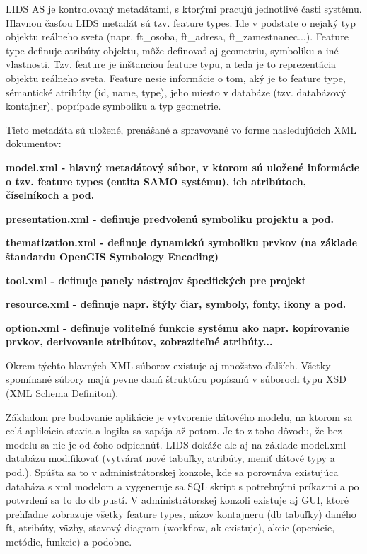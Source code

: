 LIDS AS je kontrolovaný metadátami, s ktorými pracujú jednotlivé časti systému. Hlavnou časťou LIDS metadát sú tzv. feature types. Ide v podstate o nejaký typ objektu reálneho sveta (napr. ft\_osoba, ft\_adresa, ft\_zamestnanec...). Feature type definuje atribúty objektu, môže definovať aj geometriu, symboliku a iné vlastnosti. Tzv. feature je inštanciou feature typu, a teda je to reprezentácia objektu reálneho sveta. Feature nesie informácie o tom, aký je to feature type, sémantické atribúty (id, name, type), jeho miesto v databáze (tzv. databázový kontajner), poprípade symboliku a typ geometrie.

Tieto metadáta sú uložené, prenášané a spravované vo forme nasledujúcich XML dokumentov:

\startitemize
\item{\start \bf model.xml \stop - hlavný metadátový súbor, v ktorom sú uložené informácie o tzv. feature types (entita SAMO systému), ich atribútoch, číselníkoch a pod.}
\item{\start \bf presentation.xml \stop - definuje predvolenú symboliku projektu a pod.}
\item{\start \bf thematization.xml \stop - definuje dynamickú symboliku prvkov (na základe štandardu OpenGIS Symbology Encoding)}
\item{\start \bf tool.xml \stop - definuje panely nástrojov špecifických pre projekt}
\item{\start \bf resource.xml \stop - definuje napr. štýly čiar, symboly, fonty, ikony a pod.}
\item{\start \bf option.xml \stop - definuje voliteľné funkcie systému ako napr. kopírovanie prvkov, derivovanie atribútov, zobraziteľné atribúty...}
\stopitemize 

Okrem týchto hlavných XML súborov existuje aj množstvo ďalších. Všetky spomínané súbory majú pevne danú štruktúru popísanú v súboroch typu XSD (XML Schema Definiton). 

Základom pre budovanie aplikácie je vytvorenie dátového modelu, na ktorom sa celá aplikácia stavia a logika sa zapája až potom. Je to z toho dôvodu, že bez modelu sa nie je od čoho odpichnúť. LIDS dokáže ale aj na základe model.xml databázu modifikovať (vytvárať nové tabuľky, atribúty, meniť dátové typy a pod.). Spúšta sa to v administrátorskej konzole, kde sa porovnáva existujúca databáza s xml modelom a vygeneruje sa SQL skript s potrebnými príkazmi a po potvrdení sa to do db pustí. V administrátorskej konzoli existuje aj GUI, ktoré prehľadne zobrazuje všetky feature types, názov kontajneru (db tabuľky) daného ft, atribúty, väzby, stavový diagram (workflow, ak existuje), akcie (operácie, metódie, funkcie) a podobne. 

